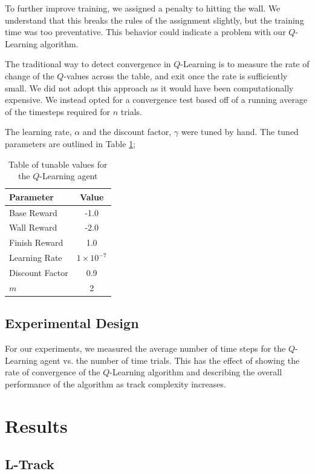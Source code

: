 \documentclass{article}
\begin{document}
			To further improve training, we assigned a penalty to hitting the wall. We understand that this breaks the rules of the assignment slightly, but the training time was too preventative. This behavior could indicate a problem with our $Q$-Learning algorithm.
			
			The traditional way to detect convergence in $Q$-Learning is to measure the rate of change of the $Q$-values across the table, and exit once the rate is sufficiently small. We did not adopt this approach as it would have been computationally expensive. We instead opted for a convergence test based off of a running average of the timesteps required for $n$ trials.
			
			The learning rate, $\alpha$ and the discount factor, $\gamma$ were tuned by hand. The tuned parameters are outlined in Table \ref{Q_params};
			
			\begin{table}
				\centering
				\begin{tabular}{|l|c|}
					\hline
					Parameter & Value \\ \hline
					Base Reward & -1.0 \\ 
					Wall Reward & -2.0 \\
					Finish Reward & 1.0 \\
					Learning Rate & $1 \times 10^{-7}$ \\
					Discount Factor & 0.9 \\
					$m$ & 2 \\ \hline
				\end{tabular}
				\caption{Table of tunable values for the $Q$-Learning agent}
				\label{Q_params}
			\end{table}
		\subsection{Experimental Design}
		
			For our experiments, we measured the average number of time steps for the $Q$-Learning agent vs. the number of time trials. This has the effect of showing the rate of convergence of the $Q$-Learning algorithm and describing the overall performance of the algorithm as track complexity increases.
		
	\section{Results}
		\subsection{L-Track}
\end{document}
